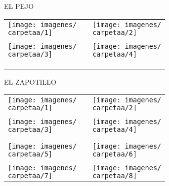 \documentclass[10pt,letter]{report}
\begin{document}
\begin{center}
	\textcolor{principal}{EL PEJO}
\end{center}
\begin{table}[H]
\centering

\footnotesize
	\begin{tabular}{m{7cm}m{1cm}m{7cm}}
	
	\texttt{[image: imagenes/\\carpetaa/1]}&&\texttt{[image: imagenes/\\carpetaa/2]}	\\
	\\
	\texttt{[image: imagenes/\\carpetaa/3]}&&\texttt{[image: imagenes/\\carpetaa/4]}	\\
	\\
	\\	
	\\
	
	\end{tabular}
	
\end{table}
\newpage

\renewcommand{\carpetaa}{el_zapotillo}

\begin{center}
	\textcolor{principal}{EL ZAPOTILLO}
\end{center}
\begin{table}[H]
\centering

\footnotesize
	\begin{tabular}{m{7cm}m{1cm}m{7cm}}
	
	\texttt{[image: imagenes/\\carpetaa/1]}&&\texttt{[image: imagenes/\\carpetaa/2]}
	\\
	\\
	\texttt{[image: imagenes/\\carpetaa/3]}&&\texttt{[image: imagenes/\\carpetaa/4]}\\
	\\
	\\
	\texttt{[image: imagenes/\\carpetaa/5]}&&\texttt{[image: imagenes/\\carpetaa/6]}
	\\
	\\
	\texttt{[image: imagenes/\\carpetaa/7]}&&\texttt{[image: imagenes/\\carpetaa/8]}\\
	
	\end{tabular}
	
\end{table}
\newpage

\renewcommand{\carpetaa}{los_reyes_esmeralda}
\end{document}
